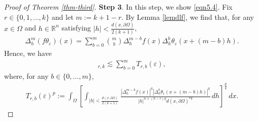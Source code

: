 \documentclass[11pt,twoside]{article}
\def\rn{{\mathbb{R}^n}}
\def\boz{{\Omega}}
\def\vez{\varepsilon}
\def\pa{\partial}                %
\theoremstyle{mylem}
\theoremstyle{definition}
\numberwithin{equation}{section}
\begin{document}
\begin{proof}[Proof of Theorem \ref{thm-third}]
{\bf Step 3}. In this step, we show \eqref{eqn5.4}.
Fix $r\in\{0,1,\dots,k\}$ and let
$m:=k+1-r$.
By Lemma \ref{lemdlf}, we find that, for any $x\in\boz$ and $h\in\rn$ satisfying $|h|<\frac{d(x,\pa\boz)}{2(k+1)}$,
\begin{align*}
\Delta_h^m(f\theta_\vez)(x)
=
\sum_{b=0}^m \binom{m}{b}
\Delta_h^{m-b}f(x)
\Delta_h^b\theta_\vez(x+(m-b)h).
\end{align*}
Hence, we have
\begin{align*}
[w_\vez]_{r,k}
\lesssim
\sum_{b=0}^m T_{r,b}(\vez),
\end{align*}
where, for any $b\in\{0,\ldots,m\}$,
\begin{align*}
T_{r,b}(\vez)^p
:=
\int_\boz
\left[
\int_{|h|<\frac{d(x,\pa\boz)}{2(k+1)}}
\frac{
|\Delta_h^{m-b}f(x)|^q
|\Delta_h^b\theta_\vez(x+(m-b)h)|^q
}
{|h|^{n+(k-r)q}d(x,\pa\boz)^{rq}}
\,dh
\right]^\frac{p}{q}
\,dx.
\end{align*}


\end{proof}
\end{document}

